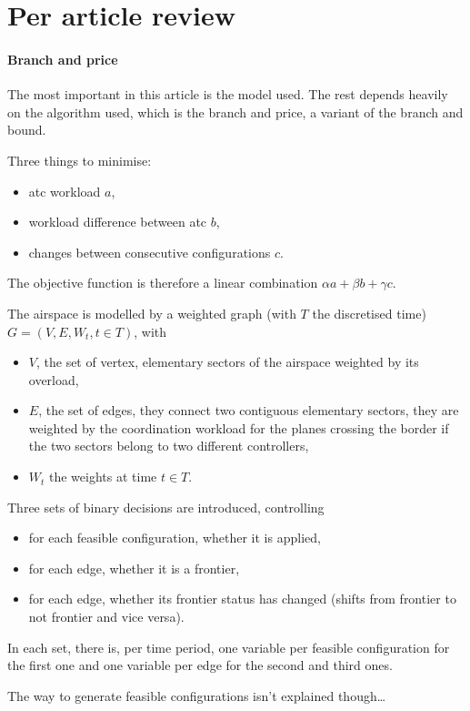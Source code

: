 \documentclass{article}
\begin{document}
\section{Per article review}
\paragraph{Branch and price~\cite{treimuth2016branch}}
The most important in this article is the model used. The rest depends heavily
on the algorithm used, which is the branch and price, a variant of the branch
and bound.

Three things to minimise:
\begin{itemize}
  \item atc workload \(a\),
  \item workload difference between atc \(b\),
  \item changes between consecutive configurations \(c\).
\end{itemize}
The objective function is therefore a linear combination \(\alpha a + \beta b +
\gamma c\).

The airspace is modelled by a weighted graph (with \(T\) the discretised time)
\(G = (V, E, W_t, t\in T)\), with
\begin{itemize}
  \item \(V\), the set of vertex, elementary sectors of the airspace weighted by
    its overload,
  \item \(E\), the set of edges, they connect two contiguous elementary sectors,
    they are weighted by the coordination workload for the planes crossing the
    border if the two sectors belong to two different controllers,
  \item \(W_t\) the weights at time \(t\in T\).
\end{itemize}


Three sets of binary decisions are introduced, controlling
\begin{itemize}
  \item for each feasible configuration, whether it is applied,
  \item for each edge, whether it is a frontier,
  \item for each edge, whether its frontier status has changed (shifts from
    frontier to not frontier and vice versa).
\end{itemize}
In each set, there is, per time period, one variable per feasible configuration
for the first one and one variable per edge for the second and third ones.

The way to generate feasible configurations isn't explained though\dots






\end{document}
